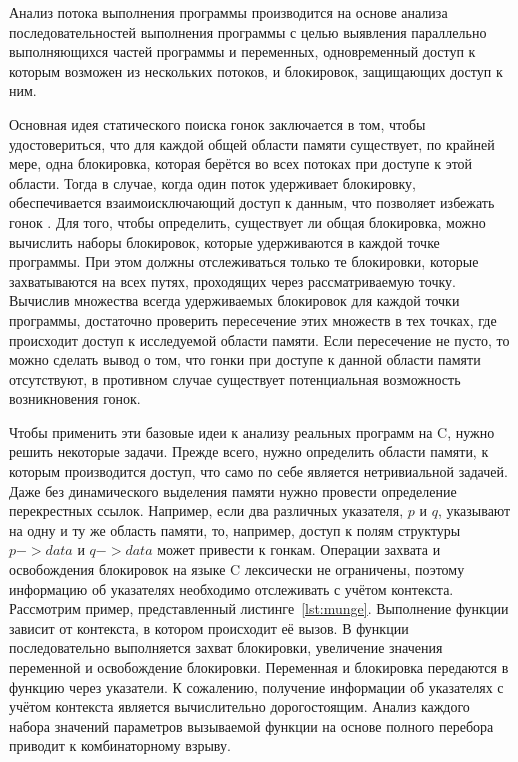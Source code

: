 





Анализ потока выполнения программы производится на основе анализа последовательностей выполнения программы с целью выявления параллельно выполняющихся частей программы и переменных, одновременный доступ к которым возможен из нескольких потоков, и блокировок, защищающих доступ к ним.

Основная идея статического поиска гонок заключается в том, чтобы удостовериться, что для каждой общей области памяти существует, по крайней мере, одна блокировка, которая берётся во всех потоках при доступе к этой области. Тогда в случае, когда один поток удерживает блокировку, обеспечивается взаимоисключающий доступ к данным, что позволяет избежать гонок \cite{Vojdani}. Для того, чтобы определить, существует ли общая блокировка, можно вычислить наборы блокировок, которые удерживаются в каждой точке программы. При этом должны отслеживаться только те блокировки, которые захватываются на всех путях, проходящих через рассматриваемую точку. Вычислив множества всегда удерживаемых блокировок для каждой точки программы, достаточно проверить пересечение этих множеств в тех точках, где происходит доступ к исследуемой области памяти. Если пересечение не пусто, то можно сделать вывод о том, что гонки при доступе к данной области памяти отсутствуют, в противном случае существует потенциальная возможность возникновения гонок.

Чтобы применить эти базовые идеи к анализу реальных программ на C, нужно решить некоторые задачи. Прежде всего, нужно определить области памяти, к которым производится доступ, что само по себе является нетривиальной задачей. Даже без динамического выделения памяти нужно провести определение перекрестных ссылок. Например, если два различных указателя, $p$ и $q$, указывают на одну и ту же область памяти, то, например, доступ к полям структуры $p->data$ и $q->data$ может привести к гонкам. Операции захвата и освобождения блокировок на языке C лексически не ограничены, поэтому информацию об указателях необходимо отслеживать с учётом контекста. Рассмотрим пример, представленный листинге~\ref{lst:munge}. Выполнение функции  зависит от контекста, в котором происходит её вызов. В функции последовательно выполняется захват блокировки, увеличение значения переменной и освобождение блокировки. Переменная и блокировка передаются в функцию через указатели. К сожалению, получение информации об указателях с учётом контекста является вычислительно дорогостоящим. Анализ каждого набора значений параметров вызываемой функции на основе полного перебора приводит к комбинаторному взрыву.

